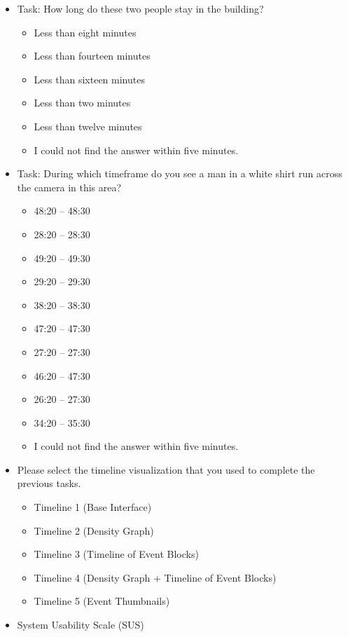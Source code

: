 \documentclass[doublespace,draft,nopageskip]{VTthesis} %
\begin{document}
\begin{itemize}
    \item Task: How long do these two people stay in the building?
    \begin{itemize}
        \item Less than eight minutes
        \item Less than fourteen minutes
        \item Less than sixteen minutes
        \item Less than two minutes
        \item Less than twelve minutes
        \item I could not find the answer within five minutes.
    \end{itemize}
    \item Task: During which timeframe do you see a man in a white shirt run across the camera in this area?
    \begin{itemize}
        \item 48:20 – 48:30
        \item 28:20 – 28:30
        \item 49:20 – 49:30
        \item 29:20 – 29:30
        \item 38:20 – 38:30
        \item 47:20 – 47:30
        \item 27:20 – 27:30
        \item 46:20 – 47:30
        \item 26:20 – 27:30
        \item 34:20 – 35:30
        \item I could not find the answer within five minutes.
    \end{itemize}
    \item Please select the timeline visualization that you used to complete the previous tasks.
    \begin{itemize}
        \item Timeline 1 (Base Interface)
        \item Timeline 2 (Density Graph)
        \item Timeline 3 (Timeline of Event Blocks)
        \item Timeline 4 (Density Graph + Timeline of Event Blocks)
        \item Timeline 5 (Event Thumbnails)
    \end{itemize}
    \item System Usability Scale (SUS)

\end{itemize}
\end{document}
